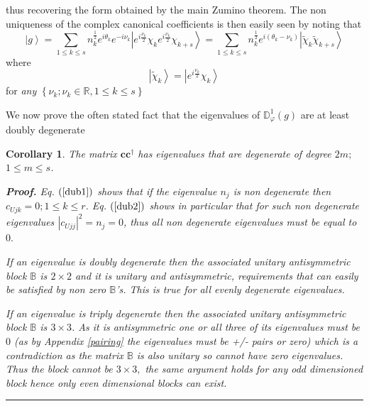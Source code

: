 \documentclass[aps,preprint]{revtex4}%
\newtheorem{corollary}{Corollary}
\newenvironment{proof}[1][Proof]{\noindent\textbf{#1.} }{\ \rule{0.5em}{0.5em}}
\begin{document}
thus recovering the form obtained by the main Zumino theorem. The non
uniqueness of the complex canonical coefficients is then easily seen by noting
that
\begin{equation}
\left\vert g\right\rangle =\sum_{1\leq k\leq s}n_{k}^{\frac{1}{2}}%
e^{i\theta_{k}}e^{-i\nu_{k}}\left\vert e^{i\frac{\nu_{k}}{2}}\chi_{k}%
e^{i\frac{\nu_{k}}{2}}\chi_{k+s}\right\rangle =\sum_{1\leq k\leq s}%
n_{k}^{\frac{1}{2}}e^{i\left(  \theta_{k}-\nu_{k}\right)  }\left\vert
\tilde{\chi}_{k}\tilde{\chi}_{k+s}\right\rangle
\end{equation}
where
\begin{equation}
\left\vert \tilde{\chi}_{k}\right\rangle =\left\vert e^{i\frac{\nu_{k}}{2}%
}\chi_{k}\right\rangle
\end{equation}
for \emph{any }$\left\{  \nu_{k};\nu_{k}\in\mathbb{R},1\leq k\leq s\right\}  $

We now prove the often stated fact that the eigenvalues of $\mathbb{D}%
_{\varphi}^{1}\left(  g\right)  $ are at least doubly degenerate

\begin{corollary}
The matrix $\mathbf{cc}^{\dagger}$ has eigenvalues that are degenerate of
degree $2m;$ $1\leq m\leq s$.

\begin{proof}
Eq. $\left(  \ref{dub1}\right)  $ shows that if the eigenvalue $n_{j}$ is non
degenerate then $c_{Ujk}=0;1\leq k\leq r$. Eq. $\left(  \ref{dub2}\right)  $
shows in particular that for such non degenerate eigenvalues $\left\vert
c_{Ujj}\right\vert ^{2}=n_{j}=0$, thus all non degenerate eigenvalues must be
equal to $0.$

If an eigenvalue is doubly degenerate then the associated unitary
antisymmetric block $\mathbb{B}$ is $2\times2$ and it is unitary and
antisymmetric, requirements that can easily be satisfied by non zero
$\mathbb{B}$'s. This is true for all evenly degenerate eigenvalues.

If an eigenvalue is triply degenerate then the associated unitary
antisymmetric block $\mathbb{B}$ is $3\times3$. As it is antisymmetric one or
all three of its eigenvalues must be $0$ (as by Appendix \ref{pairing} the
eigenvalues must be +/- pairs or zero) which is a contradiction as the matrix
$\mathbb{B}$ is also unitary so cannot have zero eigenvalues. Thus the block
cannot be $3\times3,$ the same argument holds for any odd dimensioned block
hence only even dimensional blocks can exist.
\end{proof}
\end{corollary}
\end{document}
